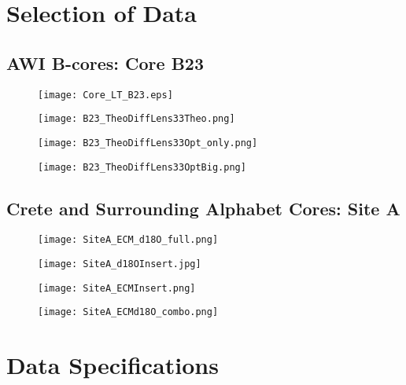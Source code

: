 \documentclass[../../CompleteThesis/Complete_1stDraft]{subfiles}
\begin{document}
\section[Selection][Selection]{Selection of Data}
\label{Sec:Data_Selection}
\subsection[AWI B-cores]{AWI B-cores: Core B23}
\label{Subsec:Data_Selection_Bcores}


\begin{figure}[h]
	\centering
	\texttt{[image: Core\_LT\_B23.eps]}
	\caption[]{}
	\label{fig:Core_LT_B23}
\end{figure}

\begin{figure}[h]
	\centering
	\texttt{[image: B23\_TheoDiffLens33Theo.png]}
	\caption[]{}
	\label{fig:B23_BD_Theo}
\end{figure}

\begin{figure}[h]
	\centering
	\texttt{[image: B23\_TheoDiffLens33Opt\_only.png]}
	\caption[]{}
	\label{fig:B23_BD_OptOnly}
\end{figure}

\begin{figure}[h]
	\centering
	\texttt{[image: B23\_TheoDiffLens33OptBig.png]}
	\caption[]{}
	\label{fig:B23_BD_OptBig}
\end{figure}


\subsection[Crete Area][Crete Area]{Crete and Surrounding Alphabet Cores: Site A}
\label{Subsec:Data_Selection_Alhabet}

\begin{figure}[h]
	\centering
	\texttt{[image: SiteA\_ECM\_d18O\_full.png]}
	\caption[]{}
	\label{fig:SiteA__ECM_d18O_full.png}
\end{figure}

\begin{figure}[h]
	\centering
	\texttt{[image: SiteA\_d18OInsert.jpg]}
	\caption[]{}
	\label{fig:SiteA_d18OInsert}
\end{figure}

\begin{figure}[h]
	\centering
	\texttt{[image: SiteA\_ECMInsert.png]}
	\caption[]{}
	\label{fig:SiteA_ECMInsert}
\end{figure}

\begin{figure}[h]
	\centering
	\texttt{[image: SiteA\_ECMd18O\_combo.png]}
	\caption[]{}
	\label{fig:SiteA_ECMd18O_combo}
\end{figure}

\section[Data Specifications][Data Specifications]{Data Specifications}
\label{Sec:Data_Specifications}
\end{document}

